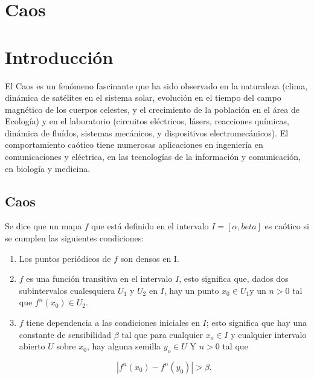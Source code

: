 \chapter{Caos}

\chapter{Introducción}
El Caos es un fenómeno fascinante que ha sido observado en la naturaleza (clima, dinámica de satélites en el sistema solar, evolución en el tiempo del campo magnético de los cuerpos celestes, y el crecimiento de la población en el área de Ecología) y en el laboratorio (circuitos eléctricos, lásers, reacciones químicas, dinámica de fluídos, sistemas mecánicos, y dispositivos electromecánicos). El comportamiento caótico tiene numerosas aplicaciones en ingeniería en comunicaciones y eléctrica, en las tecnologías de la información y comunicación, en biología y medicina. 
\section{Caos}

Se dice que un mapa $f$ que está definido en el intervalo $I= [\alpha, beta]$ es caótico si se cumplen las siguientes condiciones:

\begin{enumerate}
\item Los puntos periódicos de $f$ son densos en I.
\item $f$ es una función transitiva en el intervalo $I$, esto significa que, dados dos subintervalos cualesquiera $U_{1}$ y $U_{2}$ en $I$, hay un punto $x_{0} \in U_{1}$y un $n>0$ tal que $f^{n}(x_{0}) \in U_{2}$.
\item $f$ tiene dependencia  a las condiciones iniciales en $I$; esto significa que hay una constante de sensibilidad $\beta$ tal que para cualquier $x_{o} \in I$ y cualquier intervalo abierto $U$ sobre $x_{0}$, hay alguna semilla $y_{o} \in U$ Y $n >0$ tal que

\begin{equation}
|f^{n}(x_{0}) - f^{n}(y_{0}) | > \beta.
\end{equation} 
\end{enumerate}